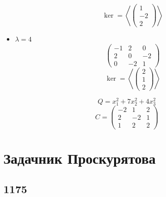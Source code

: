 \begin{itemize}
    $$ \ker = \left\langle
    \begin{pmatrix}
    	1 \\
        -2 \\
        2
    \end{pmatrix} \right\rangle $$
    \item $ \lambda = 4 $
    $$
    \begin{pmatrix}
    	-1 & 2 & 0 \\
        2 & 0 & -2 \\
        0 & -2 & 1
    \end{pmatrix} $$
    $$ \ker = \left\langle
    \begin{pmatrix}
    	2 \\
        1 \\
        2
    \end{pmatrix} \right\rangle $$
\end{itemize}
$$ Q = x_1^2 + 7x_2^2 + 4x_3^2 $$
$$ C =
\begin{pmatrix}
	-2 & 1 & 2 \\
    2 & -2 & 1 \\
    1 & 2 & 2
\end{pmatrix} $$

\section{Задачник Проскурятова}

\subsection{1175}

